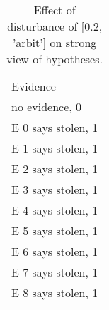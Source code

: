 \begin{table}\begin{tabular}{l}\toprule\multirow{2}{*}{Evidence} \\\\\midrule
no evidence, 0 & \\E 0 says stolen, 1 & \\E 1 says stolen, 1 & \\E 2 says stolen, 1 & \\E 3 says stolen, 1 & \\E 4 says stolen, 1 & \\E 5 says stolen, 1 & \\E 6 says stolen, 1 & \\E 7 says stolen, 1 & \\E 8 says stolen, 1 & \\\bottomrule\end{tabular}\caption{Effect of disturbance of [0.2, 'arbit'] on strong view of hypotheses.}\end{table}